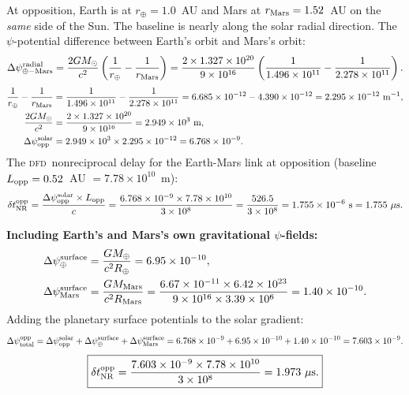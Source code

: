 \documentclass[aps,prd,twocolumn,superscriptaddress,nofootinbib,longbibliography]{revtex4-2}
\newcommand{\DFD}{\textsc{dfd}}
\begin{document}
At opposition, Earth is at $r_\oplus = 1.0$~AU and Mars at
$r_{\rm Mars} = 1.52$~AU on the \emph{same} side of the Sun.
The baseline is nearly along the solar radial direction.
The $\psi$-potential difference between Earth's orbit and Mars's orbit:
\begin{equation}
\Delta\psi_{\rm \oplus-Mars}^{\rm radial}
= \frac{2GM_\odot}{c^2}\left(\frac{1}{r_\oplus} - \frac{1}{r_{\rm Mars}}\right)
= \frac{2\times1.327\times10^{20}}{9\times10^{16}}
\left(\frac{1}{1.496\times10^{11}} - \frac{1}{2.278\times10^{11}}\right).
\end{equation}
\begin{align}
\frac{1}{r_\oplus} - \frac{1}{r_{\rm Mars}}
&= \frac{1}{1.496\times10^{11}} - \frac{1}{2.278\times10^{11}}
= 6.685\times10^{-12} - 4.390\times10^{-12} = 2.295\times10^{-12}\ \si{m^{-1}},\nonumber\\
\frac{2GM_\odot}{c^2} &= \frac{2\times1.327\times10^{20}}{9\times10^{16}}
= 2.949\times10^3\ \si{m},\nonumber\\
\Delta\psi_{\rm opp}^{\rm solar} &= 2.949\times10^3\times2.295\times10^{-12}
= 6.768\times10^{-9}.
\end{align}
The \DFD\ nonreciprocal delay for the Earth-Mars link at opposition
(baseline $L_{\rm opp} = 0.52$~AU $= 7.78\times10^{10}$~m):
\begin{equation}
\delta t_{\rm NR}^{\rm opp}
= \frac{\Delta\psi_{\rm opp}^{\rm solar}\times L_{\rm opp}}{c}
= \frac{6.768\times10^{-9}\times7.78\times10^{10}}{3\times10^8}
= \frac{526.5}{3\times10^8} = 1.755\times10^{-6}\ \si{s} = 1.755\ \mu\si{s}.
\end{equation}

\textbf{Including Earth's and Mars's own gravitational $\psi$-fields:}
\begin{align}
\Delta\psi_\oplus^{\rm surface}
&= \frac{GM_\oplus}{c^2 R_\oplus} = 6.95\times10^{-10},\nonumber\\
\Delta\psi_{\rm Mars}^{\rm surface}
&= \frac{GM_{\rm Mars}}{c^2 R_{\rm Mars}}
= \frac{6.67\times10^{-11}\times6.42\times10^{23}}{9\times10^{16}\times3.39\times10^6}
= 1.40\times10^{-10}.\nonumber
\end{align}
Adding the planetary surface potentials to the solar gradient:
\begin{equation}
\Delta\psi_{\rm total}^{\rm opp}
= \Delta\psi_{\rm opp}^{\rm solar} + \Delta\psi_\oplus^{\rm surface}
+ \Delta\psi_{\rm Mars}^{\rm surface}
= 6.768\times10^{-9} + 6.95\times10^{-10} + 1.40\times10^{-10}
= 7.603\times10^{-9}.
\end{equation}
\begin{equation}
\boxed{
\delta t_{\rm NR}^{\rm opp}
= \frac{7.603\times10^{-9}\times7.78\times10^{10}}{3\times10^8}
= 1.973\ \mu\si{s}.
}
\end{equation}
\end{document}
